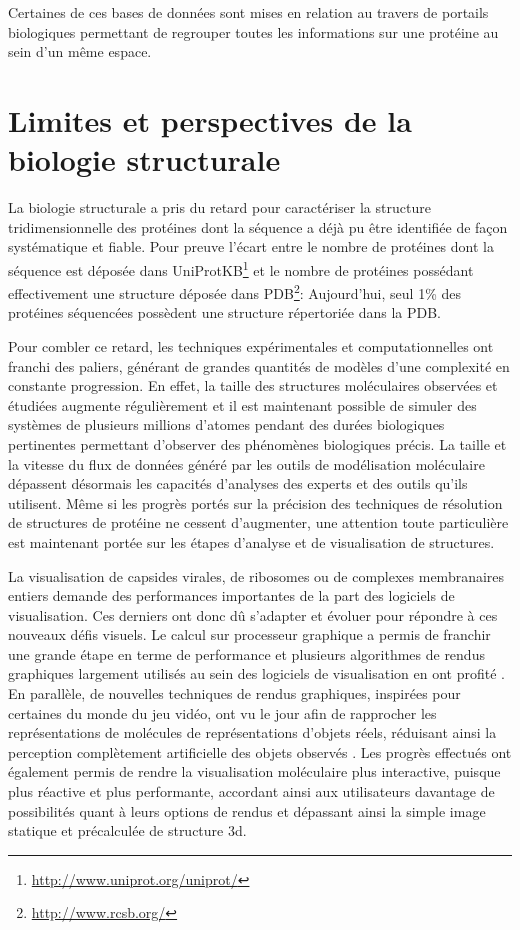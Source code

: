 Certaines de ces bases de données sont mises en relation au travers de portails biologiques permettant de regrouper toutes les informations sur une protéine au sein d'un même espace.

\section{Limites et perspectives de la biologie structurale} \label{limits_persp_bio_struct}

La biologie structurale a pris du retard pour caractériser la structure tridimensionnelle des protéines dont la séquence a déjà pu être identifiée de façon systématique et fiable. Pour preuve l'écart entre le nombre de protéines dont la séquence est déposée dans UniProtKB\footnote{\url{http://www.uniprot.org/uniprot/}} et le nombre de protéines possédant effectivement une structure déposée dans PDB\footnote{\url{http://www.rcsb.org/}}: Aujourd'hui, seul 1\% des protéines séquencées possèdent une structure répertoriée dans la PDB. 

Pour combler ce retard, les techniques expérimentales et computationnelles ont franchi des paliers, générant de grandes quantités de modèles d'une complexité en constante progression. En effet, la taille des structures moléculaires observées et étudiées augmente régulièrement et il est maintenant possible de simuler des systèmes de plusieurs millions d'atomes pendant des durées biologiques pertinentes permettant d'observer des phénomènes biologiques précis. La taille et la vitesse du flux de données généré par les outils de modélisation moléculaire dépassent désormais les capacités d'analyses des experts et des outils qu'ils utilisent. Même si les progrès portés sur la précision des techniques de résolution de structures de protéine ne cessent d'augmenter, une attention toute particulière est maintenant portée sur les étapes d'analyse et de visualisation de structures.

La visualisation de capsides virales, de ribosomes ou de complexes membranaires entiers demande des performances importantes de la part des logiciels de visualisation. Ces derniers ont donc dû s'adapter et évoluer pour répondre à ces nouveaux défis visuels. Le calcul sur processeur graphique a permis de franchir une grande étape en terme de performance et plusieurs algorithmes de rendus graphiques largement utilisés au sein des logiciels de visualisation en ont profité \cite{chavent_gpu-powered_2011}. En parallèle, de nouvelles techniques de rendus graphiques, inspirées pour certaines du monde du jeu vidéo, ont vu le jour afin de rapprocher les représentations de molécules de représentations d'objets réels, réduisant ainsi la perception complètement artificielle des objets observés \cite{lv_game_2013}. Les progrès effectués ont également permis de rendre la visualisation moléculaire plus interactive, puisque plus réactive et plus performante, accordant ainsi aux utilisateurs davantage de possibilités quant à leurs options de rendus et dépassant ainsi la simple image statique et précalculée de structure 3d.

